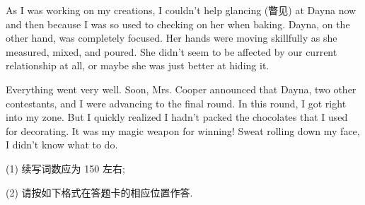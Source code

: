 \documentclass{英语试卷}
\begin{document}
\par As I was working on my creations, I couldn't help glancing (瞥见) at Dayna now and then because I was so used to checking on her when baking. Dayna, on the other hand, was completely focused. Her hands were moving skillfully as she measured, mixed, and poured. She didn't seem to be affected by our current relationship at all, or maybe she was just better at hiding it.\par
\par Everything went very well. Soon, Mrs. Cooper announced that Dayna, two other contestants, and I were advancing to the final round. In this round, I got right into my zone. But I quickly realized I hadn't packed the chocolates that I used for decorating. It was my magic weapon for winning! Sweat rolling down my face, I didn't know what to do.\par
\par (1) 续写词数应为 150 左右;\par
\par (2) 请按如下格式在答题卡的相应位置作答.\par
{}
\end{document}
